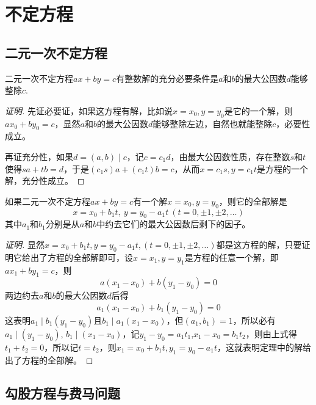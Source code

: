 
\section{不定方程}
\label{sec:indefinite-equation}

\subsection{二元一次不定方程}
\label{sec:indefinite-binary-equation-of-the-first-degree}

\begin{theorem}
  二元一次不定方程$ax+by=c$有整数解的充分必要条件是$a$和$b$的最大公因数$d$能够整除$c$.
\end{theorem}

\begin{proof}[证明]
  先证必要证，如果这方程有解，比如说$x=x_0,y=y_0$是它的一个解，则$ax_0+by_0=c$，显然$a$和$b$的最大公因数$d$能够整除左边，自然也就能整除$c$，必要性成立。

  再证充分性，如果$d=(a,b) \mid c$，记$c=c_1d$，由最大公因数性质，存在整数$s$和$t$使得$sa+tb=d$，于是$(c_1s)a+(c_1t)b=c$，从而$x=c_1s,y=c_1t$是方程的一个解，充分性成立。
\end{proof}

\begin{theorem}
  如果二元一次不定方程$ax+by=c$有一个解$x=x_0,y=y_0$，则它的全部解是
  \[ x=x_0+b_1t, \  y=y_0-a_1t \  (t=0, \pm 1, \pm 2, \ldots ) \]
  其中$a_1$和$b_1$分别是从$a$和$b$中约去它们的最大公因数后剩下的因子。
\end{theorem}

\begin{proof}[证明]
  显然$x=x_0+b_1t,y=y_0-a_1t,(t=0, \pm 1, \pm 2, \ldots)$都是这方程的解，只要证明它给出了方程的全部解即可，设$x=x_1,y=y_1$是方程的任意一个解，即$ax_1+by_1=c$，则
  \[ a(x_1-x_0)+b(y_1-y_0)=0 \]
  两边约去$a$和$b$的最大公因数$d$后得
  \[ a_1(x_1-x_0)+b_1(y_1-y_0)=0 \]
  这表明$a_1 \mid b_1(y_1-y_0)$且$b_1 \mid a_1(x_1-x_0)$，但$(a_1,b_1)=1$，所以必有$a_1 \mid (y_1-y_0)$, $b_1 \mid (x_1-x_0)$，记$y_1-y_0=a_1t_1$,$x_1-x_0=b_1t_2$，则由上式得$t_1+t_2=0$，所以记$t=t_2$，则$x_1=x_0+b_1t,y_1=y_0-a_1t$，这就表明定理中的解给出了方程的全部解。
\end{proof}

\subsection{勾股方程与费马问题}
\label{sec:pythagorean-equation-and-fermat-problem}


